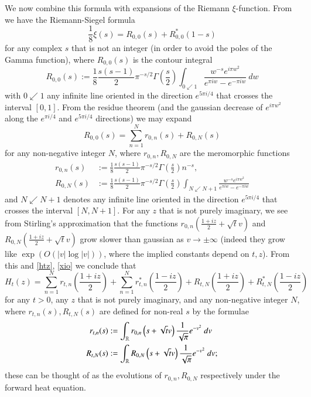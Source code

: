 We now combine this formula with expansions of the Riemann $\xi$-function.  From \cite[(2.10.6)]{titch} we have the Riemann-Siegel formula
\begin{equation}\label{xio}
 \frac{1}{8} \xi(s) = R_{0,0}(s) + R_{0,0}^*(1-s) 
\end{equation}
for any complex $s$ that is not an integer (in order to avoid the poles of the Gamma function), where $R_{0,0}(s)$ is the contour integral
$$ R_{0,0}(s) := \frac{1}{8} \frac{s(s-1)}{2} \pi^{-s/2} \Gamma\left(\frac{s}{2}\right) \int_{0 \swarrow 1} \frac{w^{-s} e^{i\pi w^2}}{e^{\pi i w} - e^{-\pi i w}}\ dw$$
with $0 \swarrow 1$ any infinite line oriented in the direction $e^{5\pi i/4}$ that crosses the interval $[0,1]$.  From the residue theorem (and the gaussian decrease of $e^{i\pi w^2}$ along the $e^{\pi i/4}$ and $e^{5\pi i/4}$ directions) we may expand
$$ R_{0,0}(s) = \sum_{n=1}^N r_{0,n}(s)+ R_{0,N}(s)$$
for any non-negative integer $N$, where $r_{0,n}, R_{0,N}$ are the meromorphic functions
\begin{align}
 r_{0,n}(s) &:= \frac{1}{8} \frac{s(s-1)}{2} \pi^{-s/2} \Gamma\left(\frac{s}{2}\right) n^{-s},\label{ron-def} \\
R_{0,N}(s) &:= \frac{1}{8} \frac{s(s-1)}{2} \pi^{-s/2} \Gamma\left(\frac{s}{2}\right) \int_{N \swarrow N+1} \frac{w^{-s} e^{i\pi w^2}}{e^{\pi i w} - e^{-\pi i w}}\label{RON-def}
\end{align}
and $N \swarrow N+1$ denotes any infinite line oriented in the direction $e^{5\pi i /4}$ that crosses the interval $[N,N+1]$.  For any $z$ that is not purely imaginary, we see from Stirling's approximation that the functions $r_{0,n}(\frac{1+iz}{2} + \sqrt{t} v)$ and $R_{0,N}(\frac{1+iz}{2} + \sqrt{t} v)$ grow slower than gaussian as $v \to \pm \infty$ (indeed they grow like $\exp( O( |v| \log |v| ) )$, where the implied constants depend on $t,z$).  From this and
\eqref{htz}, \eqref{xio} we conclude that
\begin{equation}\label{htz-expand}
 H_t(z) = \sum_{n=1}^N r_{t,n}\left(\frac{1+iz}{2}\right) + \sum_{n=1}^N r_{t,n}^*\left(\frac{1-iz}{2}\right) + R_{t,N}\left(\frac{1+iz}{2}\right) + R_{t,N}^*\left(\frac{1-iz}{2}\right)
\end{equation}
for any $t>0$, any $z$ that is not purely imaginary, and any non-negative integer $N$, where $r_{t,n}(s), R_{t,N}(s)$ are defined for non-real $s$ by the formulae
\begin{align*}
 r_{t,n}(s) &:= \int_{\mathbb{R}} r_{0,n}\left( s + \sqrt{t} v \right) \frac{1}{\sqrt{\pi}} e^{-v^2}\ dv\\
 R_{t,N}(s) &:= \int_{\mathbb{R}} R_{0,N}\left( s + \sqrt{t} v \right) \frac{1}{\sqrt{\pi}} e^{-v^2}\ dv;
\end{align*}
these can be thought of as the evolutions of $r_{0,n}, R_{0,N}$ respectively under the forward heat equation.

